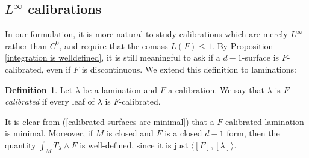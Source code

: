 \documentclass[reqno,11pt]{amsart}
\newcommand{\dfn}[1]{\emph{#1}\index{#1}}
\theoremstyle{definition}
\newtheorem{definition}[theorem]{Definition}
\numberwithin{equation}{section}
\begin{document}
\subsection{\texorpdfstring{$L^\infty$}{L-infinity} calibrations}
In our formulation, it is more natural to study calibrations which are merely $L^\infty$ rather than $C^0$, and require that the comass $L(F) \leq 1$.
By Proposition \ref{integration is welldefined}, it is still meaningful to ask if a $d-1$-surface is $F$-calibrated, even if $F$ is discontinuous.
We extend this definition to laminations:

\begin{definition}
Let $\lambda$ be a lamination and $F$ a calibration. We say that $\lambda$ is \dfn{$F$-calibrated} if every leaf of $\lambda$ is $F$-calibrated.
\end{definition}

It is clear from (\ref{calibrated surfaces are minimal}) that a $F$-calibrated lamination is minimal.
Moreover, if $M$ is closed and $F$ is a closed $d-1$ form, then the quantity $\int_M T_\lambda \wedge F$ is well-defined, since it is just $\langle [F], [\lambda]\rangle$.
\end{document}
